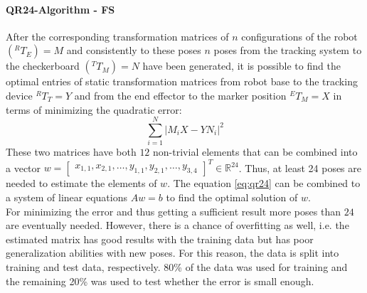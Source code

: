\documentclass[conference]{IEEEtran}
\begin{document}
\paragraph{QR24-Algorithm - FS}
After the corresponding transformation matrices of \(n\) configurations of the robot \((^RT_E)=M\) and consistently to these poses \(n\) poses from the tracking system to the checkerboard \((^TT_M)=N\) have been generated, it is possible to find the optimal entries of static transformation matrices from robot base to the tracking device \(^RT_T=Y\) and from the end effector to the marker position \(^ET_M=X\) in terms of minimizing the quadratic error:
\begin{equation*}
\label{eq:qr24}
    \sum_{i=1}^N{|M_i X - Y N_i|^2} 
\end{equation*}
These two matrices have both \(12\) non-trivial elements that can be combined into a vector \(w = \begin{bmatrix}x_{1,1},x_{2,1},\dots, y_{1,1},y_{2,1},\dots,y_{3,4}\end{bmatrix}^T \in \mathbb{R}^{24} \). Thus, at least 24 poses are needed to estimate the elements of \(w\). The equation \eqref{eq:qr24} can be combined to a system of linear equations \(Aw = b\) to find the optimal solution of \(w\)\cite{ernst2012non}.\\
For minimizing the error and thus getting a sufficient result more poses than \(24\) are eventually needed. However, there is a chance of overfitting as well, i.e. the estimated matrix has good results with the training data but has poor generalization abilities with new poses. For this reason, the data is split into training and test data, respectively. 80\% of the data was used for training and the remaining 20\% was used to test whether the error is small enough. 
\end{document}
